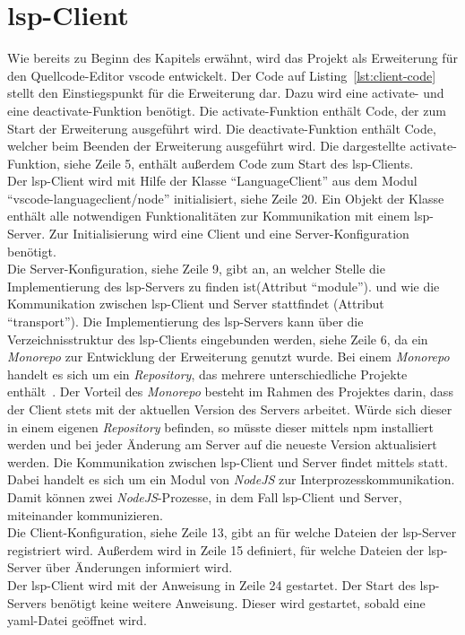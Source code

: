 \section{\acs{lsp}-Client}\label{sec:lsp-client}

Wie bereits zu Beginn des Kapitels erwähnt, wird das Projekt als Erweiterung für den Quellcode-Editor \ac{vscode} entwickelt.
Der Code auf Listing~\ref{lst:client-code} stellt den Einstiegspunkt für die Erweiterung dar.
Dazu wird eine activate- und eine deactivate-Funktion benötigt. Die activate-Funktion enthält Code, der zum Start der Erweiterung ausgeführt wird.
Die deactivate-Funktion enthält Code, welcher beim Beenden der Erweiterung ausgeführt wird.
Die dargestellte activate-Funktion, siehe Zeile 5, enthält außerdem Code zum Start des \ac{lsp}-Clients.
\\
Der \ac{lsp}-Client wird mit Hilfe der Klasse ``LanguageClient'' aus dem Modul ``vscode-languageclient/node'' initialisiert, siehe Zeile 20.
Ein Objekt der Klasse enthält alle notwendigen Funktionalitäten zur Kommunikation mit einem \ac{lsp}-Server.
Zur Initialisierung wird eine Client und eine Server-Konfiguration benötigt.
\\
Die Server-Konfiguration, siehe Zeile 9, gibt an, an welcher Stelle die Implementierung des \ac{lsp}-Servers zu finden ist(Attribut ``module'').
und wie die Kommunikation zwischen \ac{lsp}-Client und Server stattfindet (Attribut ``transport'').
Die Implementierung des \ac{lsp}-Servers kann über die Verzeichnisstruktur des \ac{lsp}-Clients eingebunden werden, siehe Zeile 6, da
ein \textit{Monorepo} zur Entwicklung der Erweiterung genutzt wurde.
Bei einem \textit{Monorepo} handelt es sich um ein \textit{Repository}, das mehrere unterschiedliche Projekte enthält~\cite{monorepo-narwhal}.
Der Vorteil des \textit{Monorepo} besteht im Rahmen des Projektes darin, dass der Client stets mit der aktuellen Version des Servers arbeitet.
Würde sich dieser in einem eigenen \textit{Repository} befinden, so müsste dieser mittels \ac{npm} installiert werden und bei jeder Änderung am Server auf
die neueste Version aktualisiert werden.
Die Kommunikation zwischen \ac{lsp}-Client und Server findet mittels  statt. Dabei handelt es sich um ein Modul von \textit{NodeJS}
zur Interprozesskommunikation. Damit können zwei \textit{NodeJS}-Prozesse, in dem Fall \acs{lsp}-Client und Server, miteinander kommunizieren.
\\
Die Client-Konfiguration, siehe Zeile 13, gibt an für welche Dateien der \ac{lsp}-Server registriert wird. Außerdem wird in Zeile 15 definiert,
für welche Dateien der \ac{lsp}-Server über Änderungen informiert wird.
\\
Der \ac{lsp}-Client wird mit der Anweisung in Zeile 24 gestartet. Der Start des \ac{lsp}-Servers benötigt keine weitere Anweisung.
Dieser wird gestartet, sobald eine \ac{yaml}-Datei geöffnet wird.

